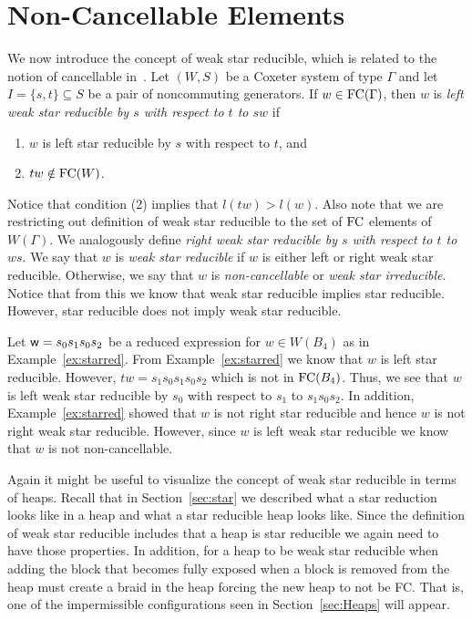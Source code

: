 

\section{Non-Cancellable Elements}
 
We now introduce the concept of weak star reducible, which is related to the notion of cancellable in~\cite{Fan1997}. Let $(W,S)$ be a Coxeter system of type $\Gamma$ and let $I=\{s,t\} \subseteq S$ be a pair of noncommuting generators. If $w  \in \mathrm{FC}(\Gamma)$, then $w$ is \emph{left weak star reducible by $s$ with respect to $t$ to $sw$} if
\begin{enumerate}
\item $w$ is left star reducible by $s$ with respect to $t$, and
\item $tw \notin \mathrm{FC}(W)$.	
\end{enumerate}
Notice that condition (2) implies that $l(tw)>l(w)$. Also note that we are restricting out definition of weak star reducible to the set of $\mathrm{FC}$ elements of $W(\Gamma)$. We analogously define \emph{right weak star reducible by $s$ with respect to $t$ to $ws$}. We say that $w$ is \emph{weak star reducible} if $w$ is either left or right weak star reducible. Otherwise, we say that $w$ is \emph{non-cancellable} or \emph{weak star irreducible}. Notice that from this we know that weak star reducible implies star reducible. However, star reducible does not imply weak star reducible.

\begin{example}\label{ex:noncancel}
 Let $\mathsf{w}=s_0s_1s_0s_2$ be a reduced expression for $w \in W(B_4)$ as in Example~\ref{ex:starred}. From Example~\ref{ex:starred} we know that $w$ is left star reducible. However, $tw=s_1s_0s_1s_0s_2$ which is not in $\mathrm{FC}(B_4)$. Thus, we see that $w$ is left weak star reducible by $s_0$ with respect to $s_1$ to $s_1s_0s_2$. In addition, Example~\ref{ex:starred} showed that $w$ is not right star reducible and hence $w$ is not right weak star reducible. However, since $w$ is left weak star reducible we know that $w$ is not non-cancellable.
\end{example}

Again it might be useful to visualize the concept of weak star reducible in terms of heaps. Recall that in Section~\ref{sec:star} we described what a star reduction looks like in a heap and what a star reducible heap looks like. Since the definition of weak star reducible includes that a heap is star reducible we again need to have those properties. In addition, for a heap to be weak star reducible when adding the block that becomes fully exposed when a block is removed from the heap must create a braid in  the heap forcing the new heap to not be FC. That is, one of the impermissible configurations seen in Section~\ref{sec:Heaps} will appear.


